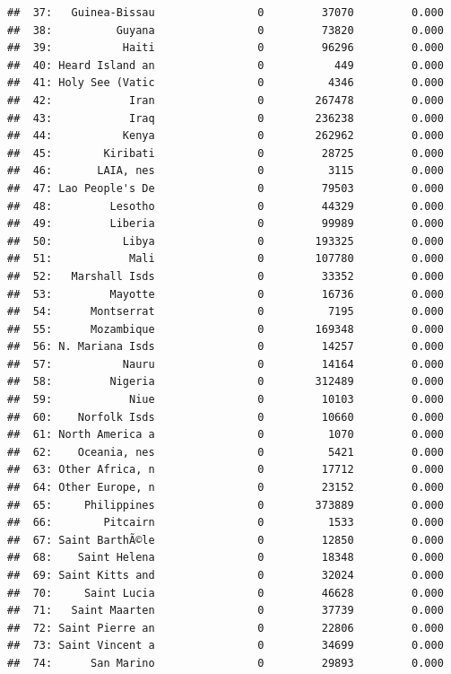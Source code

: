 \documentclass[10pt,]{article}
\begin{document}
\begin{verbatim}
##  37:   Guinea-Bissau                0         37070         0.000
##  38:          Guyana                0         73820         0.000
##  39:           Haiti                0         96296         0.000
##  40: Heard Island an                0           449         0.000
##  41: Holy See (Vatic                0          4346         0.000
##  42:            Iran                0        267478         0.000
##  43:            Iraq                0        236238         0.000
##  44:           Kenya                0        262962         0.000
##  45:        Kiribati                0         28725         0.000
##  46:       LAIA, nes                0          3115         0.000
##  47: Lao People's De                0         79503         0.000
##  48:         Lesotho                0         44329         0.000
##  49:         Liberia                0         99989         0.000
##  50:           Libya                0        193325         0.000
##  51:            Mali                0        107780         0.000
##  52:   Marshall Isds                0         33352         0.000
##  53:         Mayotte                0         16736         0.000
##  54:      Montserrat                0          7195         0.000
##  55:      Mozambique                0        169348         0.000
##  56: N. Mariana Isds                0         14257         0.000
##  57:           Nauru                0         14164         0.000
##  58:         Nigeria                0        312489         0.000
##  59:            Niue                0         10103         0.000
##  60:    Norfolk Isds                0         10660         0.000
##  61: North America a                0          1070         0.000
##  62:    Oceania, nes                0          5421         0.000
##  63: Other Africa, n                0         17712         0.000
##  64: Other Europe, n                0         23152         0.000
##  65:     Philippines                0        373889         0.000
##  66:        Pitcairn                0          1533         0.000
##  67: Saint BarthÃ©le                0         12850         0.000
##  68:    Saint Helena                0         18348         0.000
##  69: Saint Kitts and                0         32024         0.000
##  70:     Saint Lucia                0         46628         0.000
##  71:   Saint Maarten                0         37739         0.000
##  72: Saint Pierre an                0         22806         0.000
##  73: Saint Vincent a                0         34699         0.000
##  74:      San Marino                0         29893         0.000

\end{verbatim}
\end{document}
